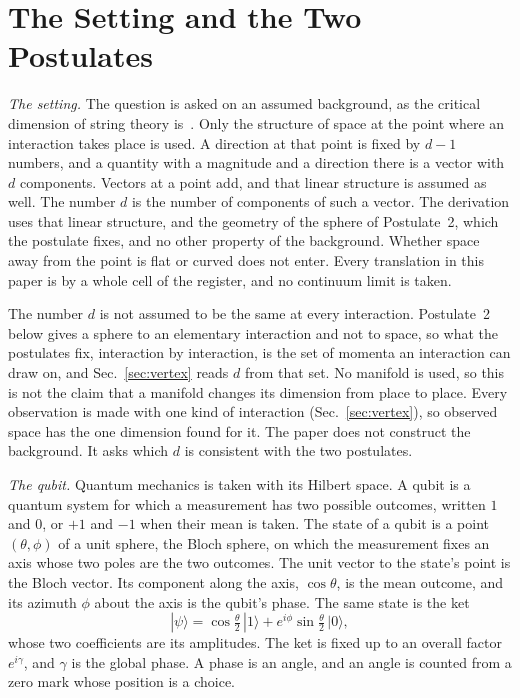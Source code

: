 \documentclass[aps,prd,twocolumn,superscriptaddress,nofootinbib]{revtex4-2}
\begin{document}
\section{The Setting and the Two Postulates}
\label{sec:postulates}

\textit{The setting.} The question is asked on an assumed background, as the critical dimension of string theory is~\cite{lovelace1971,goddard1972}. Only the structure of space at the point where an interaction takes place is used. A direction at that point is fixed by $d-1$ numbers, and a quantity with a magnitude and a direction there is a vector with $d$ components. Vectors at a point add, and that linear structure is assumed as well. The number $d$ is the number of components of such a vector. The derivation uses that linear structure, and the geometry of the sphere of Postulate~2, which the postulate fixes, and no other property of the background. Whether space away from the point is flat or curved does not enter. Every translation in this paper is by a whole cell of the register, and no continuum limit is taken.

The number $d$ is not assumed to be the same at every interaction. Postulate~2 below gives a sphere to an elementary interaction and not to space, so what the postulates fix, interaction by interaction, is the set of momenta an interaction can draw on, and Sec.~\ref{sec:vertex} reads $d$ from that set. No manifold is used, so this is not the claim that a manifold changes its dimension from place to place. Every observation is made with one kind of interaction (Sec.~\ref{sec:vertex}), so observed space has the one dimension found for it. The paper does not construct the background. It asks which $d$ is consistent with the two postulates.

\textit{The qubit.} Quantum mechanics is taken with its Hilbert space. A qubit is a quantum system for which a measurement has two possible outcomes, written $1$ and $0$, or $+1$ and $-1$ when their mean is taken. The state of a qubit is a point $(\theta,\phi)$ of a unit sphere, the Bloch sphere, on which the measurement fixes an axis whose two poles are the two outcomes. The unit vector to the state's point is the Bloch vector. Its component along the axis, $\cos\theta$, is the mean outcome, and its azimuth $\phi$ about the axis is the qubit's phase. The same state is the ket
\begin{equation}
|\psi\rangle = \cos\tfrac{\theta}{2}\,|1\rangle + e^{i\phi}\sin\tfrac{\theta}{2}\,|0\rangle ,
\label{eq:qubit}
\end{equation}
whose two coefficients are its amplitudes. The ket is fixed up to an overall factor $e^{i\gamma}$, and $\gamma$ is the global phase. A phase is an angle, and an angle is counted from a zero mark whose position is a choice.
\end{document}
